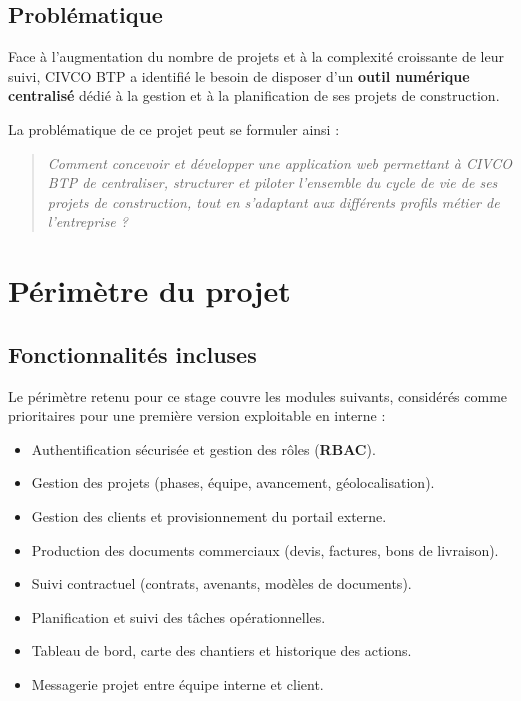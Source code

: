\subsection{Problématique}

Face à l'augmentation du nombre de projets et à la complexité croissante de leur suivi,
CIVCO BTP a identifié le besoin de disposer d'un \textbf{outil numérique centralisé} dédié
à la gestion et à la planification de ses projets de construction.

\medskip

La problématique de ce projet peut se formuler ainsi :

\begin{quote}
\textit{Comment concevoir et développer une application web permettant à CIVCO BTP de
centraliser, structurer et piloter l'ensemble du cycle de vie de ses projets de
construction, tout en s'adaptant aux différents profils métier de l'entreprise ?}
\end{quote}

\section{Périmètre du projet}

\subsection{Fonctionnalités incluses}

Le périmètre retenu pour ce stage couvre les modules suivants, considérés comme
prioritaires pour une première version exploitable en interne :

\begin{itemize}
  \item Authentification sécurisée et gestion des rôles (\textbf{RBAC}).
  \item Gestion des projets (phases, équipe, avancement, géolocalisation).
  \item Gestion des clients et provisionnement du portail externe.
  \item Production des documents commerciaux (devis, factures, bons de livraison).
  \item Suivi contractuel (contrats, avenants, modèles de documents).
  \item Planification et suivi des tâches opérationnelles.
  \item Tableau de bord, carte des chantiers et historique des actions.
  \item Messagerie projet entre équipe interne et client.
\end{itemize}


